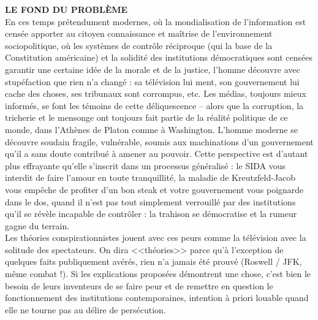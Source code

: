 \documentclass[11pt,twoside,a4paper]{article}
\begin{document}
\begin{multicols*}{2}
\textbf{\large LE FOND DU PROBL{\`E}ME}~\\
En ces temps pr{\'e}tendument modernes, o{\`u} la mondialisation de l'information est cens{\'e}e apporter au citoyen connaissance et ma{\^i}trise de l'environnement sociopolitique, o{\`u} les syst{\`e}mes de contr{\^o}le r{\'e}ciproque (qui la base de la Constitution am{\'e}ricaine) et la solidit{\'e} des institutions d{\'e}mocratiques sont cens{\'e}es garantir une certaine id{\'e}e de la morale et de la justice, l'homme d{\'e}couvre avec stup{\'e}faction que rien n'a chang{\'e} : sa t{\'e}l{\'e}vision lui ment, son gouvernement lui cache des choses, ses tribunaux sont corrompus, etc. Les m{\'e}dias, toujours mieux inform{\'e}s, se font les t{\'e}moins de cette d{\'e}liquescence – alors que la corruption, la tricherie et le mensonge ont toujours fait partie de la r{\'e}alit{\'e} politique de ce monde, dans l'Ath{\`e}nes de Platon comme {\`a} Washington. L'homme moderne se d{\'e}couvre soudain fragile, vuln{\'e}rable, soumis aux machinations d'un gouvernement qu'il a sans doute contribu{\'e} {\`a} amener au pouvoir. Cette perspective est d'autant plus effrayante qu'elle s'inscrit dans un processus g{\'e}n{\'e}ralis{\'e} : le SIDA vous interdit de faire l'amour en toute tranquillit{\'e}, la maladie de Kreutzfeld-Jacob vous emp{\^e}che de profiter d'un bon steak et votre gouvernement vous poignarde dans le dos, quand il n'est pas tout simplement verrouill{\'e} par des institutions qu'il se r{\'e}v{\`e}le incapable de contr{\^o}ler : la trahison se d{\'e}mocratise et la rumeur gagne du terrain. ~\\
Les th{\'e}ories conspirationnistes jouent avec ces peurs comme la t{\'e}l{\'e}vision avec la solitude des spectateurs. On dira <<th{\'e}ories>> parce qu'{\`a} l'exception de quelques faits publiquement av{\'e}r{\'e}s, rien n'a jamais {\'e}t{\'e} prouv{\'e} (Roswell / JFK, m{\^e}me combat !). Si les explications propos{\'e}es d{\'e}montrent une chose, c'est bien le besoin de leurs inventeurs de se faire peur et de remettre en question le fonctionnement des institutions contemporaines, intention {\`a} priori louable quand elle ne tourne pas au d{\'e}lire de pers{\'e}cution. ~\\


\end{multicols*}
\end{document}
